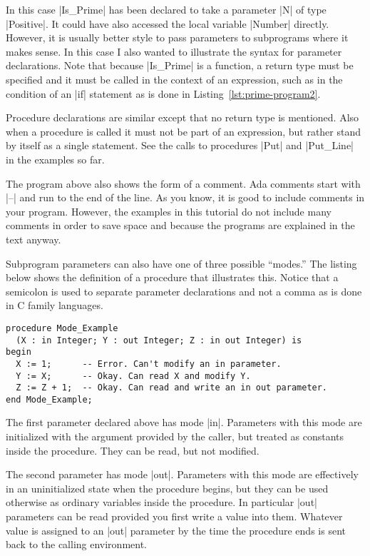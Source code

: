 In this case |Is_Prime| has been declared to take a parameter |N| of type |Positive|. It could
have also accessed the local variable |Number| directly. However, it is usually better style to
pass parameters to subprograms where it makes sense. In this case I also wanted to illustrate
the syntax for parameter declarations. Note that because |Is_Prime| is a function, a return type
must be specified and it must be called in the context of an expression, such as in the
condition of an |if| statement as is done in Listing~\ref{lst:prime-program2}.

Procedure declarations are similar except that no return type is mentioned. Also when a
procedure is called it must not be part of an expression, but rather stand by itself as a single
statement. See the calls to procedures |Put| and |Put_Line| in the examples so far.

The program above also shows the form of a comment. Ada comments start with |--| and run to the
end of the line. As you know, it is good to include comments in your program. However, the
examples in this tutorial do not include many comments in order to save space and because the
programs are explained in the text anyway.

Subprogram parameters can also have one of three possible ``modes.'' The listing below shows the
definition of a procedure that illustrates this. Notice that a semicolon is used to separate
parameter declarations and not a comma as is done in C family languages.

\begin{lstlisting}
procedure Mode_Example
  (X : in Integer; Y : out Integer; Z : in out Integer) is
begin
  X := 1;      -- Error. Can't modify an in parameter.
  Y := X;      -- Okay. Can read X and modify Y.
  Z := Z + 1;  -- Okay. Can read and write an in out parameter.
end Mode_Example;
\end{lstlisting}

The first parameter declared above has mode |in|. Parameters with this mode are initialized with
the argument provided by the caller, but treated as constants inside the procedure. They can be
read, but not modified.

The second parameter has mode |out|. Parameters with this mode are effectively in an
uninitialized state when the procedure begins, but they can be used otherwise as ordinary
variables inside the procedure. In particular |out| parameters can be read provided you first
write a value into them. Whatever value is assigned to an |out| parameter by the time the
procedure ends is sent back to the calling environment.

